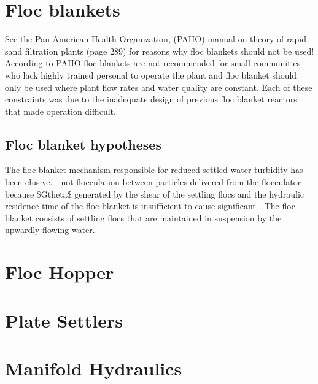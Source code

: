 \documentclass[letterpaper,10pt,english]{sphinxmanual}
\begin{document}
{\section{Floc blankets}
\label{\detokenize{Sedimentation/Sed_Intro:floc-blankets}}\label{\detokenize{Sedimentation/Sed_Intro:id1}}
See the Pan American Health Organization, (PAHO) manual on theory of rapid sand filtration plants (page 289) for reasons why floc blankets should not be used! According to PAHO floc blankets are not recommended for small communities who lack highly trained personal to operate the plant and floc blanket should only be used where plant flow rates and water quality are constant. Each of these constraints was due to the inadequate design of previous floc blanket reactors that made operation difficult.


\subsection{Floc blanket hypotheses}
\label{\detokenize{Sedimentation/Sed_Intro:floc-blanket-hypotheses}}\label{\detokenize{Sedimentation/Sed_Intro:id2}}
The floc blanket mechanism responsible for reduced settled water turbidity has been elusive.
- not flocculation between particles delivered from the flocculator because \$Gtheta\$ generated by the shear of the settling flocs and the hydraulic residence time of the floc blanket is insufficient to cause significant
- The floc blanket consists of settling flocs that are maintained in suspension by the upwardly flowing water.


\section{Floc Hopper}
\label{\detokenize{Sedimentation/Sed_Intro:floc-hopper}}\label{\detokenize{Sedimentation/Sed_Intro:id3}}

\section{Plate Settlers}
\label{\detokenize{Sedimentation/Sed_Intro:plate-settlers}}\label{\detokenize{Sedimentation/Sed_Intro:id4}}

\section{Manifold Hydraulics}
\label{\detokenize{Sedimentation/Sed_Intro:manifold-hydraulics}}\label{\detokenize{Sedimentation/Sed_Intro:id5}}

}
\end{document}
